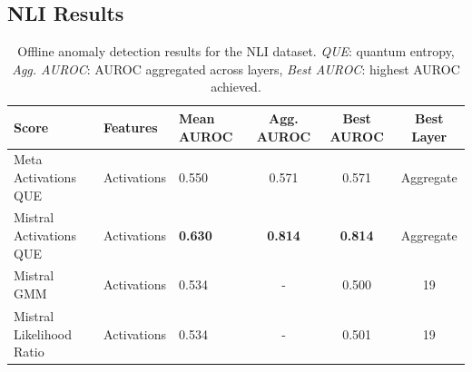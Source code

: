 \subsection{NLI Results}

\begin{table}[H]
\centering
\scriptsize  %
\renewcommand{\arraystretch}{1.2}  %
\setlength{\tabcolsep}{2pt}  %
\begin{tabular}{lp{3cm}lccc}
\toprule
\textbf{Score} & \textbf{Features} & \textbf{Mean AUROC} & \textbf{Agg. AUROC} & \textbf{Best AUROC} & \textbf{Best Layer} \\
\midrule
Meta Activations QUE             & Activations & 0.550  & 0.571  & 0.571  & Aggregate \\ 
Mistral Activations QUE          & Activations & \textbf{0.630}  & \textbf{0.814}  & \textbf{0.814}  & Aggregate \\ 
Mistral GMM & Activations & 0.534  & -      & 0.500  & 19 \\ 
Mistral Likelihood Ratio         & Activations & 0.534  & -      & 0.501  & 19 \\ 
\bottomrule
\end{tabular}
\caption{ Offline anomaly detection results for the NLI dataset. \emph{QUE}: quantum entropy, \emph{Agg. AUROC}: AUROC aggregated across layers, \emph{Best AUROC}: highest AUROC achieved.}
\label{tab:offline_anomaly_nli}
\end{table}

